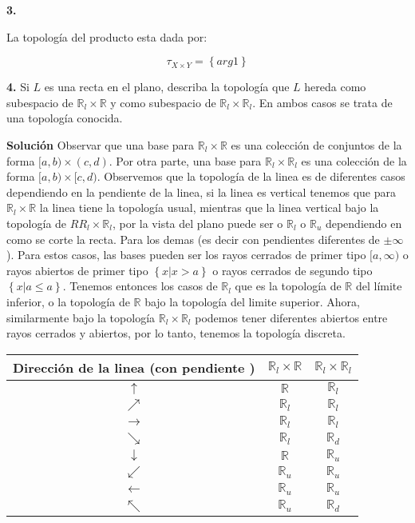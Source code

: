 \documentclass[notitlepage]{article}
\newcommand{\set}[1]{\left\lbrace #1 \right\rbrace}
\newcommand{\RR}{\mathbb{R}}
\begin{document}
\textbf{3.}

La topología del producto esta dada por:

\[  \tau_{X \times Y} = \set{arg1} \]

\textbf{4.} Si $L$ es una recta en el plano, describa la topología que $L$ hereda como subespacio de $\RR_l \times \RR$ y como subespacio de $\RR_l \times \RR_l $. En ambos casos se trata de una topología conocida.

\textbf{Solución}
Observar que una base para $\RR_l \times \RR$ es una colección de conjuntos de la forma $[a,b) \times (c,d)$. Por otra parte, una base para $\RR_l \times \RR_l$ es una colección de la forma $[a,b) \times [c,d)$. Observemos que la topología de la linea es de diferentes casos dependiendo en la pendiente de la linea, si la linea es vertical tenemos que para $\RR_l \times \RR$ la linea tiene la topología usual, mientras que la linea vertical bajo la topología de $RR_l \times \RR_l$, por la vista del plano puede ser o $\RR_l $ o $ \RR_u$ dependiendo en como se corte la recta. Para los demas (es decir con pendientes diferentes de $ \pm \infty $). Para estos casos, las bases pueden ser los rayos cerrados de primer tipo $ [a,\infty) $ o rayos abiertos de primer tipo $ \set{x | x > a} $ o rayos cerrados de segundo tipo $ \set{x | a \leq a}$. Tenemos entonces los casos de $\RR_l$ que es la topología de $\RR$ del límite inferior, o la topología de $\RR $ bajo la topología del limite superior. Ahora, similarmente bajo la topología $ \RR_l \times \RR_l$ podemos tener diferentes abiertos entre rayos cerrados y abiertos, por lo tanto, tenemos la topología discreta.
\begin{center}
\begin{tabular}{|c|c|c|}
	\hline Dirección de la linea (con pendiente )  & $\RR_l \times \RR$   & $\RR_l \times \RR_l$  \\ 
	\hline $\uparrow$ & $\RR$  & $\RR_l$  \\ 
	\hline $\nearrow$ & $\RR_l$ & $\RR_l$ \\ 
	\hline $\rightarrow $ & $\RR_l$ & $\RR_l$  \\ 
	\hline $\searrow $ & $\RR_l$ & $\RR_d$  \\ 
	\hline $\downarrow $ & $\RR$ & $\RR_u$  \\ 
	\hline $\swarrow $ & $\RR_u$ & $\RR_u$  \\ 
	\hline $ \leftarrow $ & $\RR_u$ & $\RR_u$ \\ 
	\hline $\nwarrow $ & $\RR_u$ & $\RR_d$ \\ 
	\hline 
\end{tabular} 
\end{center}
\vfill
\end{document}
